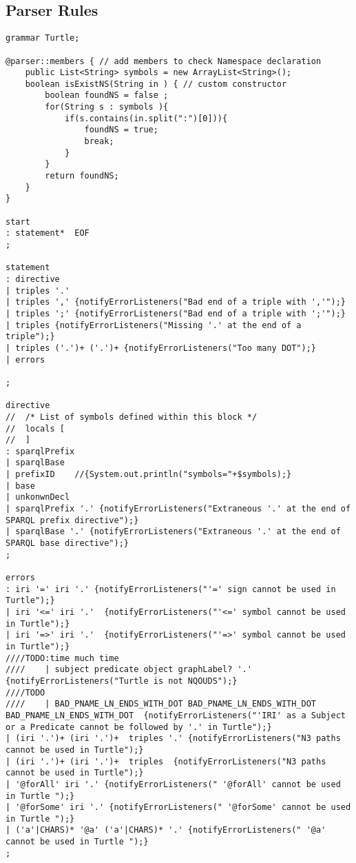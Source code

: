 \begin{appendices}


\chapter{Parser Rules}
\label{ch:appendix}

\begin{lstlisting}[breaklines,basicstyle=\ttfamily]
grammar Turtle;

@parser::members { // add members to check Namespace declaration
	public List<String> symbols = new ArrayList<String>();
	boolean isExistNS(String in ) { // custom constructor
		boolean foundNS = false ; 
		for(String s : symbols ){
			if(s.contains(in.split(":")[0])){
				foundNS = true; 
				break;
			}
		}
		return foundNS;
	}
}

start
: statement*  EOF
;

statement
: directive
| triples '.'
| triples ',' {notifyErrorListeners("Bad end of a triple with ','");}
| triples ';' {notifyErrorListeners("Bad end of a triple with ';'");}
| triples {notifyErrorListeners("Missing '.' at the end of a triple");}
| triples ('.')+ ('.')+ {notifyErrorListeners("Too many DOT");}
| errors		

;

directive
//	/* List of symbols defined within this block */
//	locals [
//	]
: sparqlPrefix
| sparqlBase 
| prefixID    //{System.out.println("symbols="+$symbols);}
| base
| unkonwnDecl
| sparqlPrefix '.' {notifyErrorListeners("Extraneous '.' at the end of SPARQL prefix directive");}
| sparqlBase '.' {notifyErrorListeners("Extraneous '.' at the end of SPARQL base directive");}
;

errors	
: iri '=' iri '.' {notifyErrorListeners("'=' sign cannot be used in Turtle");}
| iri '<=' iri '.'  {notifyErrorListeners("'<=' symbol cannot be used in Turtle");}
| iri '=>' iri '.'  {notifyErrorListeners("'=>' symbol cannot be used in Turtle");}
////TODO:time much time
////    | subject predicate object graphLabel? '.' {notifyErrorListeners("Turtle is not NQOUDS");}
////TODO
//// 	| BAD_PNAME_LN_ENDS_WITH_DOT BAD_PNAME_LN_ENDS_WITH_DOT  BAD_PNAME_LN_ENDS_WITH_DOT  {notifyErrorListeners("'IRI' as a Subject or a Predicate cannot be followed by '.' in Turtle");}
| (iri '.')+ (iri '.')+  triples '.' {notifyErrorListeners("N3 paths cannot be used in Turtle");}
| (iri '.')+ (iri '.')+  triples  {notifyErrorListeners("N3 paths cannot be used in Turtle");}
| '@forAll' iri '.' {notifyErrorListeners(" '@forAll' cannot be used in Turtle ");}
| '@forSome' iri '.' {notifyErrorListeners(" '@forSome' cannot be used in Turtle ");}
| ('a'|CHARS)* '@a' ('a'|CHARS)* '.' {notifyErrorListeners(" '@a' cannot be used in Turtle ");}
;



\end{lstlisting}
\end{appendices}
